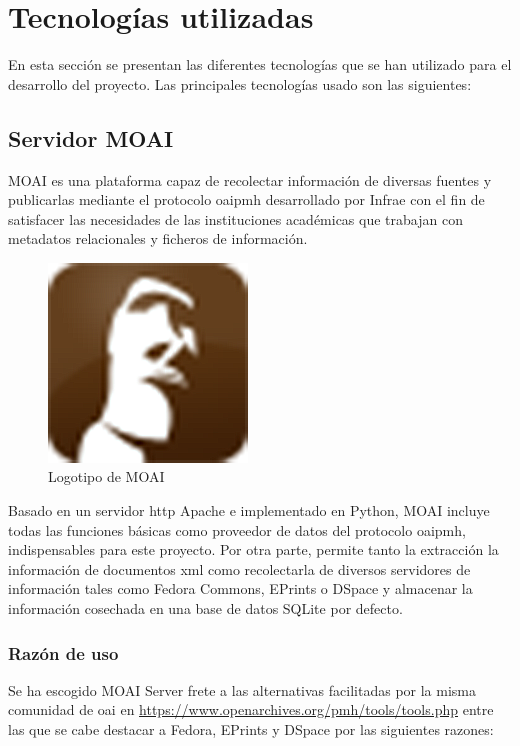 \chapter{Tecnologías utilizadas}

En esta sección se presentan las diferentes tecnologías que se han utilizado para el desarrollo del proyecto. Las principales tecnologías usado son las siguientes:

\section{Servidor MOAI}

MOAI\cite{MOAI} es una plataforma capaz de recolectar información de diversas fuentes y publicarlas mediante el protocolo \acrshort{oaipmh} desarrollado por Infrae\cite{Infrae} con el fin de satisfacer las necesidades de las instituciones académicas que trabajan con metadatos relacionales y ficheros de información.

\begin{figure}[!htbp]
	\centering
	\includegraphics{fig/moai_logo}
	\caption{Logotipo de MOAI}
\end{figure}

Basado en un servidor \acrshort{http} Apache\cite{HTTPApache} e implementado en Python, MOAI incluye todas las funciones básicas como proveedor de datos del protocolo \acrshort{oaipmh}, indispensables para este proyecto. Por otra parte, permite tanto la extracción la información de documentos \acrshort{xml} como recolectarla de diversos servidores de información tales como Fedora Commons\cite{Fedora}, EPrints\cite{EPrints} o DSpace\cite{DSpace} y almacenar la información cosechada en una base de datos SQLite\cite{SQLite} por defecto.

\subsection{Razón de uso}

Se ha escogido MOAI Server frete a las alternativas facilitadas por la misma comunidad de \acrshort{oai} en \url{https://www.openarchives.org/pmh/tools/tools.php} entre las que se cabe destacar a Fedora, EPrints y DSpace por las siguientes razones:

